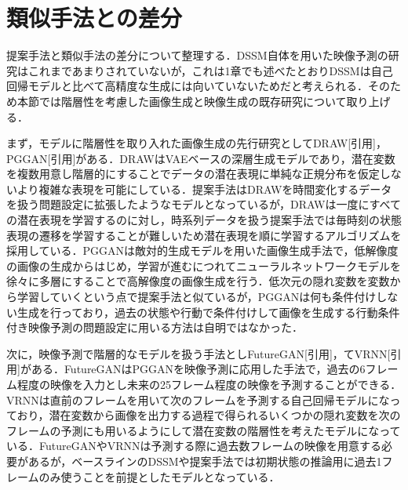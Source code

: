 \section{類似手法との差分}
提案手法と類似手法の差分について整理する．DSSM自体を用いた映像予測の研究はこれまであまりされていないが，これは1章でも述べたとおりDSSMは自己回帰モデルと比べて高精度な生成には向いていないためだと考えられる．そのため本節では階層性を考慮した画像生成と映像生成の既存研究について取り上げる．

まず，モデルに階層性を取り入れた画像生成の先行研究としてDRAW[引用]，PGGAN[引用]がある．DRAWはVAEベースの深層生成モデルであり，潜在変数を複数用意し階層的にすることでデータの潜在表現に単純な正規分布を仮定しないより複雑な表現を可能にしている．提案手法はDRAWを時間変化するデータを扱う問題設定に拡張したようなモデルとなっているが，DRAWは一度にすべての潜在表現を学習するのに対し，時系列データを扱う提案手法では毎時刻の状態表現の遷移を学習することが難しいため潜在表現を順に学習するアルゴリズムを採用している．PGGANは敵対的生成モデルを用いた画像生成手法で，低解像度の画像の生成からはじめ，学習が進むにつれてニューラルネットワークモデルを徐々に多層にすることで高解像度の画像生成を行う．低次元の隠れ変数を変数から学習していくという点で提案手法と似ているが，PGGANは何も条件付けしない生成を行っており，過去の状態や行動で条件付けして画像を生成する行動条件付き映像予測の問題設定に用いる方法は自明ではなかった．

次に，映像予測で階層的なモデルを扱う手法としFutureGAN[引用]，てVRNN[引用]がある．FutureGANはPGGANを映像予測に応用した手法で，過去の6フレーム程度の映像を入力とし未来の25フレーム程度の映像を予測することができる．VRNNは直前のフレームを用いて次のフレームを予測する自己回帰モデルになっており，潜在変数から画像を出力する過程で得られるいくつかの隠れ変数を次のフレームの予測にも用いるようにして潜在変数の階層性を考えたモデルになっている．FutureGANやVRNNは予測する際に過去数フレームの映像を用意する必要があるが，ベースラインのDSSMや提案手法では初期状態の推論用に過去1フレームのみ使うことを前提としたモデルとなっている．



